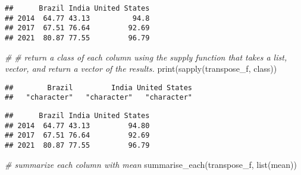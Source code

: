 \documentclass[
]{article}
\newenvironment{Shaded}{\begin{snugshade}}{\end{snugshade}}
\newcommand{\CommentTok}[1]{\textcolor[rgb]{0.56,0.35,0.01}{\textit{#1}}}
\newcommand{\FunctionTok}[1]{\textcolor[rgb]{0.00,0.00,0.00}{#1}}
\newcommand{\NormalTok}[1]{#1}
\newcommand{\OtherTok}[1]{\textcolor[rgb]{0.56,0.35,0.01}{#1}}
\newcommand{\SpecialCharTok}[1]{\textcolor[rgb]{0.00,0.00,0.00}{#1}}
\newcommand{\StringTok}[1]{\textcolor[rgb]{0.31,0.60,0.02}{#1}}
\begin{document}
\begin{verbatim}
##      Brazil India United States
## 2014  64.77 43.13          94.8
## 2017  67.51 76.64         92.69
## 2021  80.87 77.55         96.79
\end{verbatim}

\begin{Shaded}
\begin{Highlighting}[]
\CommentTok{\#}
\CommentTok{\# return a class of each column using the supply function that takes a list, vector, and return a vector of the results.}
\FunctionTok{print}\NormalTok{(}\FunctionTok{sapply}\NormalTok{(transpose\_f, class))}
\end{Highlighting}
\end{Shaded}

\begin{verbatim}
##        Brazil         India United States 
##   "character"   "character"   "character"
\end{verbatim}

\begin{Shaded}
\end{Shaded}

\begin{verbatim}
##      Brazil India United States
## 2014  64.77 43.13         94.80
## 2017  67.51 76.64         92.69
## 2021  80.87 77.55         96.79
\end{verbatim}

\begin{Shaded}
\begin{Highlighting}[]
\CommentTok{\# summarize each column with mean}
\FunctionTok{summarise\_each}\NormalTok{(transpose\_f, }\FunctionTok{list}\NormalTok{(mean))}
\end{Highlighting}
\end{Shaded}
\end{document}
